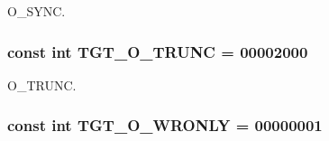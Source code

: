 O\_\-SYNC. \hypertarget{classAlphaTru64_a4f892ee6e1424a2becd859b0bef1f18b}{
\subsubsection[{TGT\_\-O\_\-TRUNC}]{\setlength{\rightskip}{0pt plus 5cm}const int {\bf TGT\_\-O\_\-TRUNC} = 00002000}}
\label{classAlphaTru64_a4f892ee6e1424a2becd859b0bef1f18b}


O\_\-TRUNC. \hypertarget{classAlphaTru64_a6156c069cefe05ce3cce033b2e0c2de2}{
\subsubsection[{TGT\_\-O\_\-WRONLY}]{\setlength{\rightskip}{0pt plus 5cm}const int {\bf TGT\_\-O\_\-WRONLY} = 00000001}}
\label{classAlphaTru64_a6156c069cefe05ce3cce033b2e0c2de2}


